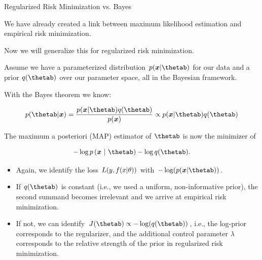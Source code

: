 \begin{vbframe} {Regularized Risk Minimization vs. Bayes}

We have already created a link between maximum likelihood estimation and 
empirical risk minimization.

\lz 

Now we will generalize this for regularized risk minimization.

\lz

Assume we have a parameterized distribution $p(\xv | \thetab)$ for our data and 
a prior $q(\thetab)$ over our parameter space, all in the Bayesian framework.

\lz 

With the Bayes theorem we know:

$$
p(\thetab | \xv) = \frac{p(\xv | \thetab) q(\thetab) }{p(\xv)} \propto 
p(\xv | \thetab) q(\thetab)
$$

\framebreak

The maximum a posteriori (MAP) estimator of $\thetab$ is now the minimizer of

$$
- \log p\left(\xv ~|~ \thetab\right) - \log q(\thetab).
$$

\begin{itemize}
  \item Again, we identify the loss $L(y, f(x | \theta))$ with $-\log(p(\xv | \thetab))$.
  \item If $q(\thetab)$ is constant (i.e., we used a uniform, non-informative 
  prior), the second summand becomes irrelevant and we arrive 
  at empirical risk minimization.
  \item If not, we can identify $J(\thetab) \propto -\log(q(\thetab))$, i.e., 
  the log-prior corresponds to the regularizer, and the additional control 
  parameter $\lambda$ corresponds to the relative strength of the prior in 
  regularized risk minimization.
\end{itemize}

\framebreak

\begin{figure}
  \centering
\end{figure}


\end{vbframe}
